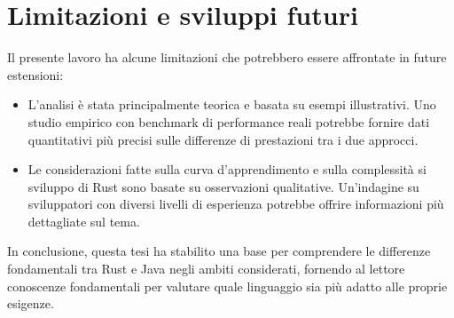 \section{Limitazioni e sviluppi futuri}
Il presente lavoro ha alcune limitazioni che potrebbero essere affrontate in future estensioni:
\begin{itemize}
    \item L'analisi è stata principalmente teorica e basata su esempi illustrativi. Uno studio empirico con benchmark di performance reali potrebbe fornire dati quantitativi più precisi sulle differenze di prestazioni tra i due approcci.
    \item Le considerazioni fatte sulla curva d'apprendimento e sulla complessità si sviluppo di Rust sono basate su osservazioni qualitative. Un'indagine su sviluppatori con diversi livelli di esperienza potrebbe offrire informazioni più dettagliate sul tema.
\end{itemize}
In conclusione, questa tesi ha stabilito una base per comprendere le differenze fondamentali tra Rust e Java negli ambiti considerati, fornendo al lettore conoscenze fondamentali per valutare quale linguaggio sia più adatto alle proprie esigenze.